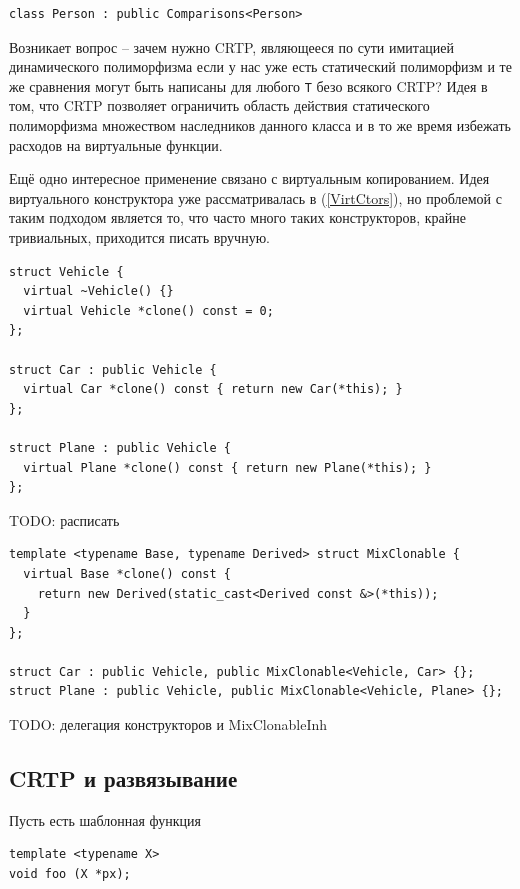 \documentclass[a4paper,12pt,oneside]{book}
\begin{document}
\begin{lstlisting}
class Person : public Comparisons<Person>
\end{lstlisting}

Возникает вопрос -- зачем нужно CRTP, являющееся по сути имитацией динамического полиморфизма если у нас уже есть статический полиморфизм и те же сравнения могут быть написаны для любого \lstinline!T! безо всякого CRTP? Идея в том, что CRTP позволяет ограничить область действия статического полиморфизма множеством наследников данного класса и в то же время избежать расходов на виртуальные функции.

Ещё одно интересное применение связано с виртуальным копированием. Идея виртуального конструктора уже рассматривалась в (\ref{VirtCtors}), но проблемой с таким подходом является то, что часто много таких конструкторов, крайне тривиальных, приходится писать вручную.

\begin{lstlisting}
struct Vehicle {
  virtual ~Vehicle() {}
  virtual Vehicle *clone() const = 0;
};

struct Car : public Vehicle {
  virtual Car *clone() const { return new Car(*this); }
}; 

struct Plane : public Vehicle {
  virtual Plane *clone() const { return new Plane(*this); }
};
\end{lstlisting}

TODO: расписать 

\begin{lstlisting}
template <typename Base, typename Derived> struct MixClonable {
  virtual Base *clone() const {
    return new Derived(static_cast<Derived const &>(*this));
  }
};

struct Car : public Vehicle, public MixClonable<Vehicle, Car> {}; 
struct Plane : public Vehicle, public MixClonable<Vehicle, Plane> {};
\end{lstlisting}

TODO: делегация конструкторов и MixClonableInh

\subsection{CRTP и развязывание}\label{VasilCase}

Пусть есть шаблонная функция

\begin{lstlisting}
template <typename X>
void foo (X *px);
\end{lstlisting}
\end{document}
